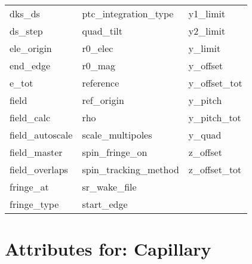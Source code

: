 \begin{tabular}{lll}
dks_ds                      & ptc_integration_type        & y1_limit                    \\
ds_step                     & quad_tilt                   & y2_limit                    \\
ele_origin                  & r0_elec                     & y_limit                     \\
end_edge                    & r0_mag                      & y_offset                    \\
e_tot                       & reference                   & y_offset_tot                \\
field                       & ref_origin                  & y_pitch                     \\
field_calc                  & rho                         & y_pitch_tot                 \\
field_autoscale                & scale_multipoles            & y_quad                      \\
field_master                & spin_fringe_on              & z_offset                    \\
field_overlaps              & spin_tracking_method        & z_offset_tot                \\
fringe_at                   & sr_wake_file                &                             \\
fringe_type                 & start_edge                  &                             \\
 \bottomrule
 \end{tabular}
 \vfill
 
 \section{Attributes for: Capillary}
 \label{s:list.capillary}
 
